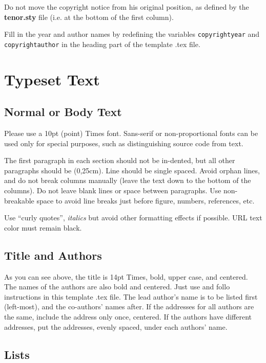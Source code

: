 \documentclass{article}
\begin{document}
Do not move the copyright notice from his original position, as defined by the \textbf{tenor.sty} file (i.e. at the bottom of the first column). 

Fill in the year and author names by redefining the variables \texttt{copyrightyear} and \texttt{copyrightauthor} in the heading part of the template .tex file.

\section{Typeset Text}\label{sec:typeset_text}

\subsection{Normal or Body Text}\label{subsec:body}
Please use a 10pt (point) Times font. 
Sans-serif or non-proportional fonts can be used only for special purposes, such as distinguishing source code from text.

The first paragraph in each section should not be in-dented, but all other paragraphs should be (0,25cm). Line should be single spaced. Avoid orphan lines, and do not break columns manually (leave the text down to the bottom of the columns). Do not leave blank lines or space between paragraphs. Use non-breakable space to avoid line breaks just before figure, numbers, references, etc. 

Use ``curly quotes'', \textit{italics} but avoid other formatting effects if possible. 
URL text color must remain black.

\subsection{Title and Authors}

As you can see above, the title is 14pt Times, bold, upper case, and centered.
The names of the authors are also bold and centered.
Just use and follo instructions in this template .tex file.
The lead author's name is to be listed first (left-most), and the co-authors' 
names after. 
If the addresses for all authors are the same, include the 
address only once, centered. If the authors have different addresses, put the 
addresses, evenly spaced, under each authors' name.


\subsection{Lists}
\end{document}
